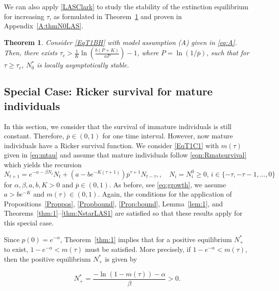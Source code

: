 \documentclass{article}
\newtheorem{theorem}{Theorem}
\numberwithin{theorem}{section}
\begin{document}
{We can also apply \eqref{LASClark} to study the stability of the extinction equilibrium for increasing $\tau$, as formulated in Theorem~\ref{thm:N0LAS} and proven in Appendix~\ref{A:thmN0LAS}. 
\begin{theorem}\label{thm:N0LAS}
Consider \eqref{EqT1BH} with model assumption (A) given in \eqref{eq:A}. Then, there exists $\tau_c>\frac{1}{K}\ln\left(\frac{b(P+K)}{aP}\right) -1$, where $P=\ln(1/\overline{p})$, such that for $\tau\geq \tau_c$, $N^*_0$ is locally asymptotically stable.
\end{theorem}





\subsection{Special Case: Ricker survival for mature individuals}

In this section, we consider that the survival of immature individuals is still constant. Therefore, $\overline{p}\in (0,1)$ for one time interval. However, now mature individuals have a Ricker survival function. We consider 
\eqref{EqT1C1} with $m(\tau)$ given in \eqref{eq:mtau} and assume that mature individuals follow  \eqref{eqn:Rmatsurvival} which yields the recursion
\begin{equation}\label{EqT1R}
N_{t+1}=e^{-\alpha-\beta N_t}N_t + \left(a - b e^{-K(\tau+1)}\right)
\overline{p}^{\tau+1} N_{t-\tau}, , \quad  N_i=N_i^0 \geq 0, \, i  \in \{-\tau, -\tau-1, \ldots, 0\}
\end{equation}
for $\alpha, \beta, a,b,K>0$ and $\overline{p}\in (0,1)$. As before, see \eqref{eq:growth}, we assume $a>be^{-K}$ and $m(\tau)\in (0,1)$. Again, the conditions for the application of Propositions~\ref{Proppos}, \ref{Propbound}, \ref{Prop:bound}, Lemma~\ref{lem:1}, and Theorems~\ref{thm:1}--\ref{thm:NstarLAS1} are satisfied so that these results apply for this special case.

Since $p(0)=e^{-\alpha}$, Theorem~\ref{thm:1} implies that for a positive equilibrium $N^*_+$ to exist, $1-e^{-\alpha}<m(\tau)$ must be satisfied. More precisely, if $1-e^{-\alpha}<m(\tau)$, then the positive equilibrium $N^*_+$ is given by  

\begin{equation}\label{eq:q}
N^*_+=\frac{-\ln(1-m(\tau))-\alpha}{\beta}>0.
\end{equation}

}
\end{document}
